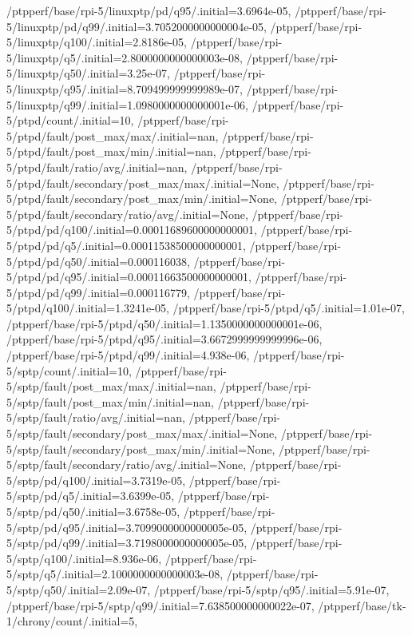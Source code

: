 {    /ptpperf/base/rpi-5/linuxptp/pd/q95/.initial=3.6964e-05,
    /ptpperf/base/rpi-5/linuxptp/pd/q99/.initial=3.7052000000000004e-05,
    /ptpperf/base/rpi-5/linuxptp/q100/.initial=2.8186e-05,
    /ptpperf/base/rpi-5/linuxptp/q5/.initial=2.8000000000000003e-08,
    /ptpperf/base/rpi-5/linuxptp/q50/.initial=3.25e-07,
    /ptpperf/base/rpi-5/linuxptp/q95/.initial=8.709499999999989e-07,
    /ptpperf/base/rpi-5/linuxptp/q99/.initial=1.0980000000000001e-06,
    /ptpperf/base/rpi-5/ptpd/count/.initial=10,
    /ptpperf/base/rpi-5/ptpd/fault/post_max/max/.initial=nan,
    /ptpperf/base/rpi-5/ptpd/fault/post_max/min/.initial=nan,
    /ptpperf/base/rpi-5/ptpd/fault/ratio/avg/.initial=nan,
    /ptpperf/base/rpi-5/ptpd/fault/secondary/post_max/max/.initial=None,
    /ptpperf/base/rpi-5/ptpd/fault/secondary/post_max/min/.initial=None,
    /ptpperf/base/rpi-5/ptpd/fault/secondary/ratio/avg/.initial=None,
    /ptpperf/base/rpi-5/ptpd/pd/q100/.initial=0.00011689600000000001,
    /ptpperf/base/rpi-5/ptpd/pd/q5/.initial=0.00011538500000000001,
    /ptpperf/base/rpi-5/ptpd/pd/q50/.initial=0.000116038,
    /ptpperf/base/rpi-5/ptpd/pd/q95/.initial=0.00011663500000000001,
    /ptpperf/base/rpi-5/ptpd/pd/q99/.initial=0.000116779,
    /ptpperf/base/rpi-5/ptpd/q100/.initial=1.3241e-05,
    /ptpperf/base/rpi-5/ptpd/q5/.initial=1.01e-07,
    /ptpperf/base/rpi-5/ptpd/q50/.initial=1.1350000000000001e-06,
    /ptpperf/base/rpi-5/ptpd/q95/.initial=3.6672999999999996e-06,
    /ptpperf/base/rpi-5/ptpd/q99/.initial=4.938e-06,
    /ptpperf/base/rpi-5/sptp/count/.initial=10,
    /ptpperf/base/rpi-5/sptp/fault/post_max/max/.initial=nan,
    /ptpperf/base/rpi-5/sptp/fault/post_max/min/.initial=nan,
    /ptpperf/base/rpi-5/sptp/fault/ratio/avg/.initial=nan,
    /ptpperf/base/rpi-5/sptp/fault/secondary/post_max/max/.initial=None,
    /ptpperf/base/rpi-5/sptp/fault/secondary/post_max/min/.initial=None,
    /ptpperf/base/rpi-5/sptp/fault/secondary/ratio/avg/.initial=None,
    /ptpperf/base/rpi-5/sptp/pd/q100/.initial=3.7319e-05,
    /ptpperf/base/rpi-5/sptp/pd/q5/.initial=3.6399e-05,
    /ptpperf/base/rpi-5/sptp/pd/q50/.initial=3.6758e-05,
    /ptpperf/base/rpi-5/sptp/pd/q95/.initial=3.7099000000000005e-05,
    /ptpperf/base/rpi-5/sptp/pd/q99/.initial=3.7198000000000005e-05,
    /ptpperf/base/rpi-5/sptp/q100/.initial=8.936e-06,
    /ptpperf/base/rpi-5/sptp/q5/.initial=2.1000000000000003e-08,
    /ptpperf/base/rpi-5/sptp/q50/.initial=2.09e-07,
    /ptpperf/base/rpi-5/sptp/q95/.initial=5.91e-07,
    /ptpperf/base/rpi-5/sptp/q99/.initial=7.638500000000022e-07,
    /ptpperf/base/tk-1/chrony/count/.initial=5,
}
